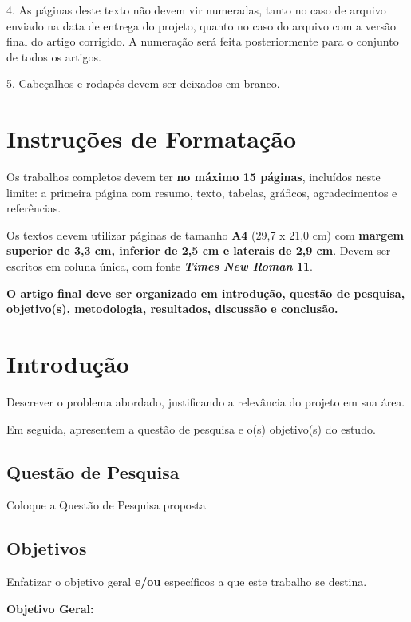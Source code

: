 \documentclass[a4paper,11pt]{article}
\begin{document}
4. As páginas deste texto não devem vir numeradas, tanto no caso de arquivo enviado na data de entrega do projeto, quanto no caso do arquivo com a versão final do artigo corrigido.
A numeração será feita posteriormente para o conjunto de todos os artigos.

5. Cabeçalhos e rodapés devem ser deixados em branco.

\vspace{0.2cm}

\section*{ Instruções de Formatação}
Os trabalhos completos devem ter \textbf{no máximo 15 páginas}, incluídos neste limite: a primeira página com resumo, texto, tabelas, gráficos, agradecimentos e referências.

Os textos devem utilizar páginas de tamanho \textbf{A4} (29,7 x 21,0 cm) com \textbf{margem superior de 3,3 cm, inferior de 2,5 cm e laterais de 2,9 cm}.
 Devem ser escritos em coluna única, com fonte \textbf{\textit{Times New Roman} 11}.

\vspace{1cm}

\noindent \textbf{O artigo final deve ser organizado em introdução, questão de pesquisa, objetivo(s), metodologia, resultados, discussão e conclusão.}

\section{Introdução}
Descrever o problema abordado, justificando a relevância do projeto em sua área.

Em seguida, apresentem a questão de pesquisa e o(s) objetivo(s) do estudo.

\subsection{Questão de Pesquisa}
Coloque a Questão de Pesquisa proposta

\subsection{Objetivos}
Enfatizar o objetivo geral \textbf{e/ou }específicos a que este trabalho se destina.

\vspace{0.2cm}

\textbf{Objetivo Geral:}
\end{document}
